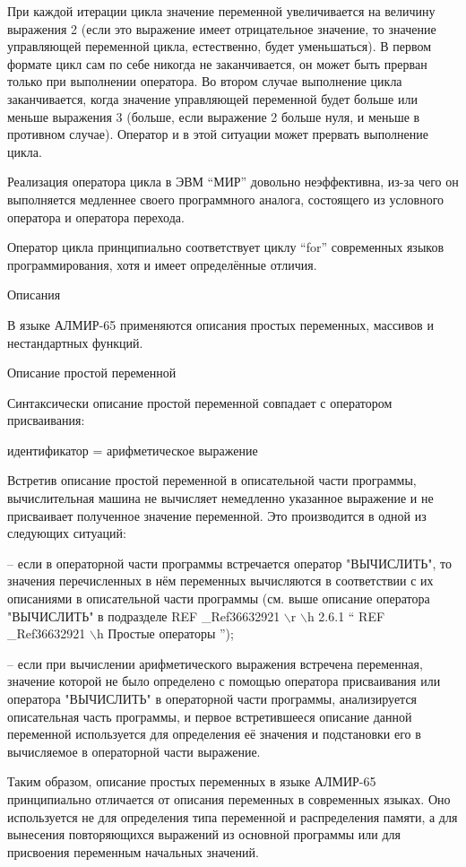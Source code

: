 \documentclass[11pt]{article}
\begin{document}
При каждой итерации цикла значение
переменной увеличивается на величину
выражения 2 (если это выражение имеет
отрицательное значение, то значение
управляющей переменной цикла,
естественно, будет уменьшаться). В
первом формате цикл сам по себе никогда
не заканчивается, он может быть прерван
только при выполнении оператора. Во
втором случае выполнение цикла
заканчивается, когда значение
управляющей переменной будет больше
или меньше выражения 3 (больше, если
выражение 2 больше нуля, и меньше в
противном случае). Оператор и в этой
ситуации может прервать выполнение
цикла.

Реализация оператора цикла в ЭВМ
“МИР” довольно неэффективна, из-за
чего он выполняется медленнее своего
программного аналога, состоящего из
условного оператора и оператора
перехода.

Оператор цикла принципиально
соответствует циклу “for” современных
языков программирования, хотя и имеет
определённые отличия.

Описания

В языке АЛМИР-65 применяются описания
простых переменных, массивов и
нестандартных функций.

Описание простой переменной

Синтаксически описание простой
переменной совпадает с оператором
присваивания:

идентификатор = арифметическое
выражение

Встретив описание простой переменной в
описательной части программы,
вычислительная машина не вычисляет
немедленно указанное выражение и не
присваивает полученное значение
переменной. Это производится в одной из
следующих ситуаций:

– если в операторной части программы
встречается оператор "ВЫЧИСЛИТЬ", то
значения перечисленных в нём
переменных вычисляются в соответствии
с их описаниями в описательной части
программы (см. выше описание оператора
"ВЫЧИСЛИТЬ" в подразделе   REF \_Ref36632921
$\backslash$r $\backslash$h  2.6.1  “  REF \_Ref36632921 $\backslash$h
 Простые операторы ”);

– если при вычислении арифметического
выражения встречена переменная,
значение которой не было определено с
помощью оператора присваивания или
оператора "ВЫЧИСЛИТЬ" в операторной
части программы, анализируется
описательная часть программы, и первое
встретившееся описание данной
переменной используется для
определения её значения и подстановки
его в вычисляемое в операторной части
выражение.

Таким образом, описание простых
переменных в языке АЛМИР-65
принципиально отличается от описания
переменных в современных языках. Оно
используется не для определения типа
переменной и распределения памяти, а
для вынесения повторяющихся выражений
из основной программы или для
присвоения переменным начальных
значений.
\end{document}
